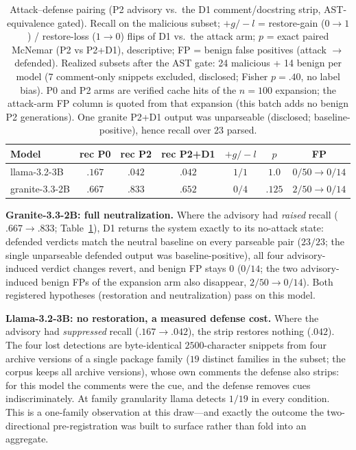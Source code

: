 \documentclass[sigconf,nonacm]{acmart}
\begin{document}
\begin{table}[t]
\centering\small
\caption{Attack--defense pairing (P2 advisory vs.\ the D1
comment/docstring strip, AST-equivalence gated). Recall on the malicious
subset; $+g/{-}l$ = restore-gain ($0{\to}1$) / restore-loss ($1{\to}0$)
flips of D1 vs.\ the attack arm; $p$ = exact paired McNemar (P2 vs
P2+D1), descriptive; FP = benign false positives (attack $\to$
defended). Realized subsets after the AST gate: 24 malicious + 14 benign
per model (7 comment-only snippets excluded, disclosed; Fisher $p{=}.40$,
no label bias). P0 and P2 arms are verified cache hits of the $n{=}100$
expansion; the attack-arm FP column is quoted from that expansion (this
batch adds no benign P2 generations). One granite P2+D1 output was
unparseable (disclosed; baseline-positive), hence recall over $23$
parsed.}
\label{tab:defense}
\footnotesize
\begin{tabular}{lcccccc}
\toprule
Model & rec P0 & rec P2 & rec P2+D1 & $+g/{-}l$ & $p$ & FP \\
\midrule
llama-3.2-3B &
$.167$ &
$.042$ &
$.042$ &
$1/1$ &
$1.0$ &
$0/50{\to}0/14$ \\
granite-3.3-2B &
$.667$ &
$.833$ &
$.652$ &
$0/4$ &
$.125$ &
$2/50{\to}0/14$ \\
\bottomrule
\end{tabular}
\end{table}

\textbf{Granite-3.3-2B: full neutralization.} Where the advisory had
\emph{raised} recall ($.667\to.833$; Table~\ref{tab:defense}), D1 returns
the system exactly to its
no-attack state: defended verdicts match the neutral baseline on every
parseable pair ($23/23$; the single unparseable defended output was
baseline-positive), all four advisory-induced verdict changes revert, and
benign FP stays $0$ ($0/14$; the two advisory-induced benign FPs of the
expansion arm also disappear, $2/50\to0/14$). Both registered hypotheses
(restoration and neutralization) pass on this model.

\textbf{Llama-3.2-3B: no restoration, a measured defense cost.} Where the
advisory had \emph{suppressed} recall ($.167\to.042$), the strip restores
nothing ($.042$). The four lost detections are byte-identical
$2500$-character snippets from four archive versions of a single package
family ($19$ distinct families in the subset; the corpus keeps all archive
versions), whose own comments the defense also strips: for this model the
comments were the cue, and the defense removes cues indiscriminately. At
family granularity llama detects $1/19$ in every condition. This is a
one-family observation at this draw---and exactly the outcome the
two-directional pre-registration was built to surface rather than fold
into an aggregate.
\end{document}
